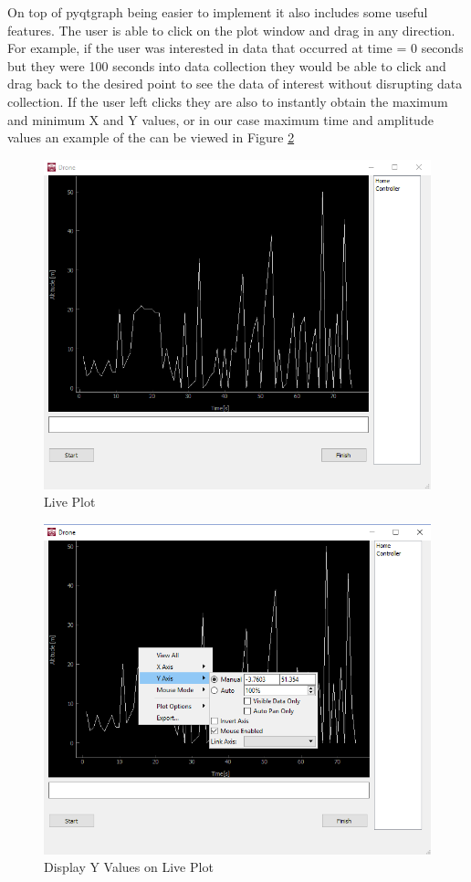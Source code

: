 On top of pyqtgraph being easier to implement it also includes some useful features. The user is able to click on the plot window and drag in any direction. For example, if the user was interested in data that occurred at time = 0 seconds but they were 100 seconds into data collection they would be able to click and drag back to the desired point to see the data of interest without disrupting data collection. If the user left clicks they are also to instantly obtain the maximum and minimum X and Y values, or in our case maximum time and amplitude values an example of the can be viewed in Figure \ref{fig:plot2}
\begin{figure}[H]
	\includegraphics[width=\linewidth]{plot.png}
	\caption{Live Plot}
	\label{fig:plt}
\end{figure}
\begin{figure}[H]
	\includegraphics[width=\linewidth]{plot2.png}
	\caption{Display Y Values on Live Plot}
	\label{fig:plot2}
\end{figure}
